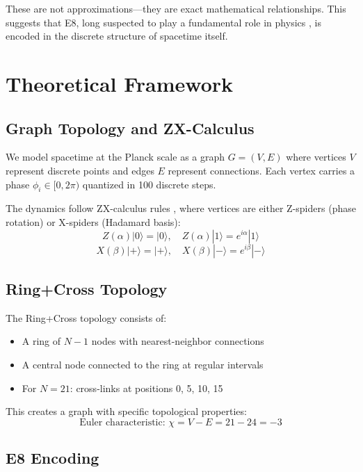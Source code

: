 \documentclass[12pt,a4paper]{article}
\begin{document}
These are not approximations—they are exact mathematical relationships. This suggests that E8, long suspected to play a fundamental role in physics \cite{Lisi2007}, is encoded in the discrete structure of spacetime itself.

\section{Theoretical Framework}

\subsection{Graph Topology and ZX-Calculus}

We model spacetime at the Planck scale as a graph $G = (V, E)$ where vertices $V$ represent discrete points and edges $E$ represent connections. Each vertex carries a phase $\phi_i \in [0, 2\pi)$ quantized in 100 discrete steps.

The dynamics follow ZX-calculus rules \cite{Coecke2008}, where vertices are either Z-spiders (phase rotation) or X-spiders (Hadamard basis):
\begin{equation}
Z(\alpha) |0\rangle = |0\rangle, \quad Z(\alpha) |1\rangle = e^{i\alpha} |1\rangle
\end{equation}
\begin{equation}
X(\beta) |+\rangle = |+\rangle, \quad X(\beta) |-\rangle = e^{i\beta} |-\rangle
\end{equation}

\subsection{Ring+Cross Topology}

The Ring+Cross topology consists of:
\begin{itemize}
\item A ring of $N-1$ nodes with nearest-neighbor connections
\item A central node connected to the ring at regular intervals
\item For $N=21$: cross-links at positions 0, 5, 10, 15
\end{itemize}

This creates a graph with specific topological properties:
\begin{equation}
\text{Euler characteristic: } \chi = V - E = 21 - 24 = -3
\end{equation}

\subsection{E8 Encoding}
\end{document}
